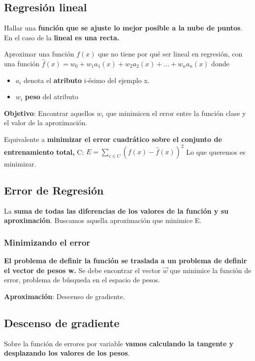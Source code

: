 \documentclass[12pt, twoside, openright]{report} %
\begin{document}
\subsection{Regresión lineal}

Hallar una \textbf{función que se ajuste lo mejor posible a la nube de
	puntos}. En el caso de la \textbf{lineal es una recta.}

Aproximar una función \(f(x)\) que no tiene por qué ser lineal en
regresión, con una función
\textbf{\(\hat{f}(x)= w_0 + w_1a_1(x)+ w_2a_2(x)+ ...+ w_na_n(x)\)}
donde

\begin{itemize}
	\item \(a_i\) denota el \textbf{atributo} i-ésimo del ejemplo x.
	\item \(w_i\) \textbf{peso} del atributo
\end{itemize}

\textbf{Objetivo}: Encontrar aquellos \(w_i\) que minimicen el error
entre la función clase y el valor de la aproximación.

Equivalente a \textbf{minimizar el error cuadrático sobre el conjunto de
	entrenamiento total, } C: \(E= \sum _{c \in C} (f(x)-\hat{f}(x))^2\) Lo
que queremos es minimizar.

\subsection{Error de Regresión}

La \textbf{suma de todas las diferencias de los valores de la función y
	su aproximación}. Buscamos aquella aproximación que minimice E.

\subsubsection{Minimizando el error}

\textbf{El problema de definir la función se traslada a un problema de
	definir el vector de pesos w.} Se debe encontrar el vector \(\vec{w}\)
que minimice la función de error, problema de búsqueda en el espacio de
pesos.

\textbf{Aproximación}: Descenso de gradiente.

\subsection{Descenso de gradiente}
Sobre la función de errores por variable \textbf{vamos calculando la tangente y desplazando los valores de los pesos}.
\end{document}
